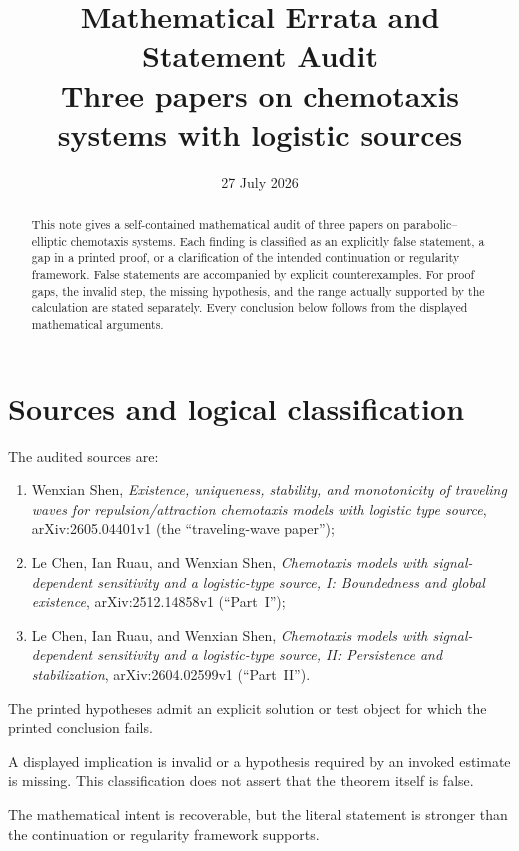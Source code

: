 \documentclass[11pt]{article}
\title{Mathematical Errata and Statement Audit\\
\large Three papers on chemotaxis systems with logistic sources}
\author{}
\date{27 July 2026}
\newcommand{\False}{\textsc{False statement}}
\newcommand{\Gap}{\textsc{Proof gap}}
\newcommand{\Clarify}{\textsc{Clarification}}
\begin{document}
\maketitle

\begin{abstract}
This note gives a self-contained mathematical audit of three papers on
parabolic--elliptic chemotaxis systems.  Each finding is classified as an
explicitly false statement, a gap in a printed proof, or a clarification of
the intended continuation or regularity framework.  False statements are
accompanied by explicit counterexamples.  For proof gaps, the invalid step,
the missing hypothesis, and the range actually supported by the calculation
are stated separately.  Every conclusion below follows from the displayed
mathematical arguments.
\end{abstract}

\tableofcontents

\section{Sources and logical classification}

The audited sources are:
\begin{enumerate}[leftmargin=2em]
\item Wenxian Shen, \emph{Existence, uniqueness, stability, and monotonicity
  of traveling waves for repulsion/attraction chemotaxis models with logistic
  type source}, arXiv:2605.04401v1 (the ``traveling-wave paper'');
\item Le Chen, Ian Ruau, and Wenxian Shen,
  \emph{Chemotaxis models with signal-dependent sensitivity and a
  logistic-type source, I: Boundedness and global existence},
  arXiv:2512.14858v1 (``Part~I'');
\item Le Chen, Ian Ruau, and Wenxian Shen,
  \emph{Chemotaxis models with signal-dependent sensitivity and a
  logistic-type source, II: Persistence and stabilization},
  arXiv:2604.02599v1 (``Part~II'').
\end{enumerate}

\begin{description}[leftmargin=2.1em,style=nextline]
\item[\False] The printed hypotheses admit an explicit solution or test
  object for which the printed conclusion fails.
\item[\Gap] A displayed implication is invalid or a hypothesis required by
  an invoked estimate is missing.  This classification does not assert that
  the theorem itself is false.
\item[\Clarify] The mathematical intent is recoverable, but the literal
  statement is stronger than the continuation or regularity framework
  supports.
\end{description}
\end{document}
